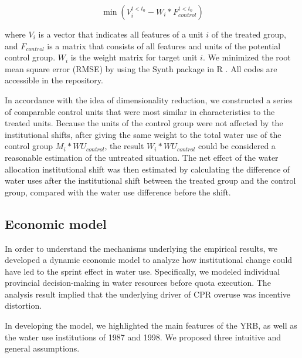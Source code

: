\documentclass{../nsr}
\begin{document}
$$\min(V_{i}^{t<t_0} - W_i * F_{control}^{t<t_0})$$

where $V_i$ is a vector that indicates all features of a unit $i$ of the treated group, and $F_{control}$ is a matrix that consists of all features and units of the potential control group. $W_i$ is the weight matrix for target unit $i$. We minimized the root mean square error (RMSE) by using the Synth package in R \cite{abadieSynthPackageSynthetic2011, abadieComparativePoliticsSynthetic2015}. All codes are accessible in the repository.

In accordance with the idea of dimensionality reduction, we constructed a series of comparable control units that were most similar in characteristics to the treated units. Because the units of the control group were not affected by the institutional shifts, after giving the same weight to the total water use of the control group $M_i * WU_{control}$, the result $W_i*WU_{control}$ could be considered a reasonable estimation of the untreated situation. The net effect of the water allocation institutional shift was then estimated by calculating the difference of water uses after the institutional shift between the treated group and the control group, compared with the water use difference before the shift.

\subsection{Economic model}
In order to understand the mechanisms underlying the empirical results, we developed a dynamic economic model to analyze how institutional change could have led to the sprint effect in water use. Specifically, we modeled individual provincial decision-making in water resources before quota execution. The analysis result implied that the underlying driver of CPR overuse was incentive distortion.

In developing the model, we highlighted the main features of the YRB, as well as the water use institutions of 1987 and 1998. We proposed three intuitive and general assumptions.
\end{document}
